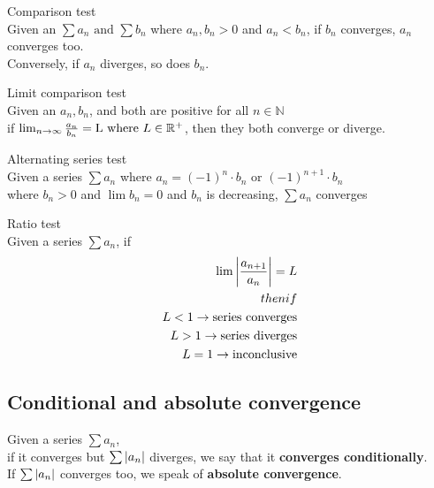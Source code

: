 \documentclass[17pt]{extarticle} %
\begin{document}
\begin{theorem*}{Comparison test} \\
Given an $\sum a_n \text{ and } \sum b_n$ where $a_n, b_n > 0$ and $a_n < b_n$, if $b_n$ converges, $a_n$ converges too. \\
Conversely, if $a_n$ diverges, so does $b_n$.\\

\end{theorem*}

\begin{theorem*}{Limit comparison test}\\
    Given an $a_n, b_n$,  and both are positive for all $n \in \mathbb{N}$\\
    if $\lim_{n \to \infty} {a_n \over b_n} = \text{L where } L \in \mathbb{R^+}$, then they both converge or diverge. 
    
\end{theorem*}  

\begin{theorem*}{Alternating series test}\\
    Given a series $\sum a_n$ where $a_n = (-1)^n \cdot b_n \text{ or } (-1)^{n +1} \cdot b_n$ \\
     where $b_n > 0$ and $\lim b_n = 0$ and $b_n$ is decreasing, $\sum a_n$ converges 
    
\end{theorem*}
\newpage
\begin{theorem*}{Ratio test}\\
    Given a series $\sum a_n$, if 
    $$
    \begin{aligned}
        \lim \left|a_{n+1} \over a_n\right| = L \\
        then if \\
        L < 1 \to \text{series converges}\\
        L > 1 \to \text{series diverges}\\
        L = 1 \to \text{inconclusive}\\
    \end{aligned}
    $$
    
\end{theorem*}

\subsection*{Conditional and absolute convergence}
Given a series $\sum a_n$, \\
if it converges but $\sum \left|a_n\right|$ diverges, we say that it \textbf{converges conditionally}. \\
If $\sum \left|a_n\right|$ converges too, we speak of \textbf{absolute convergence}.
\end{document}

